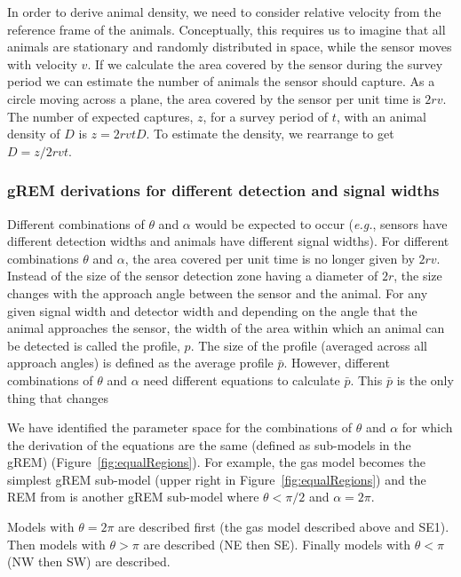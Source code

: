 In order to derive animal density, we need to consider relative velocity from the reference frame of the animals.
Conceptually, this requires us to imagine that all animals are stationary and randomly distributed in space, while the sensor moves with velocity $v$.
If we calculate the area covered by the sensor during the survey period we can estimate the number of animals the sensor should capture.
As a circle moving across a plane, the area covered by the sensor per unit time is $2rv$.
The number of expected captures, $z$, for a survey period of $t$, with an animal density of $D$ is $z = 2rvtD$.
To estimate the density, we rearrange to get $D = z/2rvt$.

\subsubsection{gREM derivations for different detection and signal widths}
Different combinations of $\theta$ and $\alpha$ would be expected to occur (\emph{e.g.}, sensors have different detection widths and animals have different signal widths).
For different combinations $\theta$ and $\alpha$, the area covered per unit time is no longer given by $2rv$.
Instead of the size of the sensor detection zone having a diameter of $2r$, the size changes with the approach angle between the sensor and the animal.
For any given signal width and detector width and depending on the angle that the animal approaches the sensor, the width of the area within which an animal can be detected is called the profile, $p$.
The size of the profile (averaged across all approach angles) is defined as the average profile $\bar{p}$.
However, different combinations of $\theta$ and $\alpha$ need different equations to calculate $\bar{p}$.
This $\bar{p}$ is the only thing that changes 

We have identified the parameter space for the combinations of $\theta$ and $\alpha$ for which the derivation of the equations are the same (defined as sub-models in the gREM) (Figure~\ref{fig:equalRegions}).
For example, the gas model becomes the simplest gREM sub-model (upper right in Figure~\ref{fig:equalRegions}) and the REM from \cite{rowcliffe2008estimating} is another gREM sub-model where $\theta<\pi/2$ and $\alpha = 2\pi$.

Models with $\theta = 2\pi$ are described first (the gas model described above and SE1).
Then models with $\theta > \pi$ are described (NE then SE).
Finally models with $\theta < \pi$ (NW then SW) are described.

